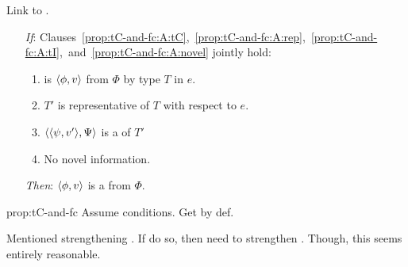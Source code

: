 \begin{note}
  Link \tC{} to .

  \begin{proposition}[\tC{2} and \fc{1}]
    \label{prop:tC-and-fc}

    \noindent%

    \begin{itemize}
    \item[\emph{If}:]
      Clauses~\ref{prop:tC-and-fc:A:tC},~\ref{prop:tC-and-fc:A:rep},~\ref{prop:tC-and-fc:A:tI},~and~\ref{prop:tC-and-fc:A:novel} jointly hold:
      \begin{enumerate}[label=\arabic*., ref=(\arabic*)]
      \item
        \label{prop:tC-and-fc:A:tC}
        \vAgent{} is \tCV{} \(\langle \phi, v \rangle\) from \(\Phi\) by type \(T\) in \(e\).
      \item
        \label{prop:tC-and-fc:A:rep}
        \(T'\) is representative of \(T\) with respect to \(e\).
      \item
        \label{prop:tC-and-fc:A:tI}
        \(\langle \langle \psi, v' \rangle, \Psi \rangle\) is a \tI{} of \(T'\)
      \item
        \label{prop:tC-and-fc:A:novel}
        No novel information.
      \end{enumerate}
    \item[\emph{Then}:]
      \(\langle \phi, v \rangle\) is a \fc{} from \(\Phi\).
    \end{itemize}
    \vspace{-\baselineskip}
  \end{proposition}

  \begin{argument}{prop:tC-and-fc}
    Assume conditions.
    Get \fc{} by def.
  \end{argument}

  Mentioned strengthening .
  If do so, then need to strengthen \tC{}.
  Though, this seems entirely reasonable.
\end{note}


